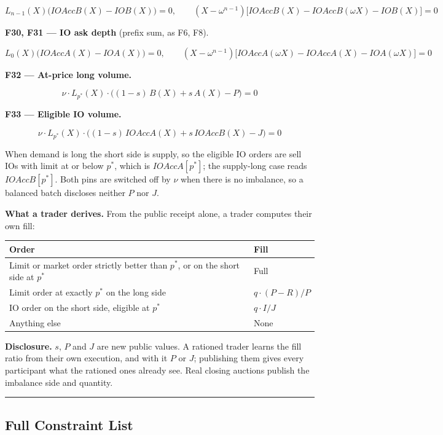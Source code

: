 \[L_{n-1}(X)\big(IOAccB(X) - IOB(X)\big) = 0, \qquad (X - \omega^{n-1})\big[IOAccB(X) - IOAccB(\omega X) - IOB(X)\big] = 0\]

\textbf{F30, F31 --- IO ask depth} (prefix sum, as F6, F8).

\[L_{0}(X)\big(IOAccA(X) - IOA(X)\big) = 0, \qquad (X - \omega^{n-1})\big[IOAccA(\omega X) - IOAccA(X) - IOA(\omega X)\big] = 0\]

\textbf{F32 --- At-price long volume.}

\[\nu \cdot L_{p^*}(X) \cdot \big((1-s)\,B(X) + s\,A(X) - P\big) = 0\]

\textbf{F33 --- Eligible IO volume.}

\[\nu \cdot L_{p^*}(X) \cdot \big((1-s)\,IOAccA(X) + s\,IOAccB(X) - J\big) = 0\]

When demand is long the short side is supply, so the eligible IO orders are sell IOs with limit at or below \(p^*\), which is \(IOAccA[p^*]\); the supply-long case reads \(IOAccB[p^*]\). Both pins are switched off by \(\nu\) when there is no imbalance, so a balanced batch discloses neither \(P\) nor \(J\).

\textbf{What a trader derives.} From the public receipt alone, a trader computes their own fill:

\begin{longtable}[]{@{}ll@{}}
\toprule\noalign{}
Order & Fill \\
\midrule\noalign{}
\endhead
\bottomrule\noalign{}
\endlastfoot
Limit or market order strictly better than \(p^*\), or on the short side at \(p^*\) & Full \\
Limit order at exactly \(p^*\) on the long side & \(q \cdot (P - R)/P\) \\
IO order on the short side, eligible at \(p^*\) & \(q \cdot I/J\) \\
Anything else & None \\
\end{longtable}

\textbf{Disclosure.} \(s\), \(P\) and \(J\) are new public values. A rationed trader learns the fill ratio from their own execution, and with it \(P\) or \(J\); publishing them gives every participant what the rationed ones already see. Real closing auctions publish the imbalance side and quantity.

\begin{center}\rule{0.5\linewidth}{0.5pt}\end{center}

\subsection{Full Constraint List}

